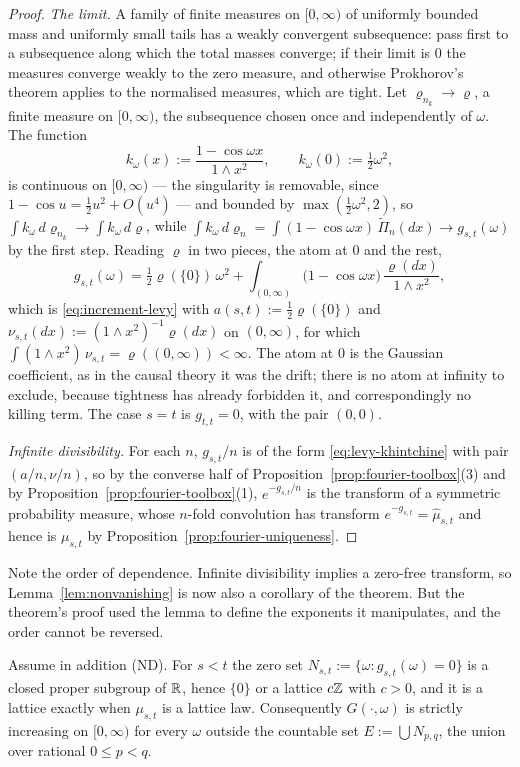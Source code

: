 \begin{proof}
\emph{The limit.} A family of finite measures on $[0,\infty)$ of uniformly bounded mass and
uniformly small tails has a weakly convergent subsequence: pass first to a subsequence along
which the total masses converge; if their limit is $0$ the measures converge weakly to the
zero measure, and otherwise Prokhorov's theorem applies to the normalised measures, which
are tight. Let $\varrho_{n_k} \to \varrho$, a finite measure on $[0,\infty)$, the subsequence
chosen once and independently of $\omega$. The function
\[
  k_\omega(x) := \frac{1 - \cos\omega x}{1 \wedge x^2}, \qquad k_\omega(0) := \tfrac12\omega^2,
\]
is continuous on $[0,\infty)$ --- the singularity is removable, since
$1 - \cos u = \tfrac12u^2 + O(u^4)$ --- and bounded by $\max(\tfrac12\omega^2, 2)$, so
$\int k_\omega\,d\varrho_{n_k} \to \int k_\omega\,d\varrho$, while
$\int k_\omega\,d\varrho_n = \int (1-\cos\omega x)\,\widetilde\Pi_n(dx) \to g_{s,t}(\omega)$ by
the first step. Reading $\varrho$ in two pieces, the atom at $0$ and the rest,
\[
  g_{s,t}(\omega) = \tfrac12\varrho(\{0\})\,\omega^2
   + \int_{(0,\infty)} \bigl(1 - \cos\omega x\bigr)\,\frac{\varrho(dx)}{1 \wedge x^2},
\]
which is \ref{eq:increment-levy} with $a(s,t) := \tfrac12\varrho(\{0\})$ and
$\nu_{s,t}(dx) := (1 \wedge x^2)^{-1}\varrho(dx)$ on $(0,\infty)$, for which
$\int (1 \wedge x^2)\,\nu_{s,t} = \varrho((0,\infty)) < \infty$. The atom at $0$ is the Gaussian
coefficient, as in the causal theory it was the drift; there is no atom at infinity to exclude,
because tightness has already forbidden it, and correspondingly no killing term. The case
$s = t$ is $g_{t,t} = 0$, with the pair $(0,0)$.

\emph{Infinite divisibility.} For each $n$, $g_{s,t}/n$ is of the form
\ref{eq:levy-khintchine} with pair $(a/n, \nu/n)$, so by the converse half of
Proposition~\ref{prop:fourier-toolbox}(3) and by Proposition~\ref{prop:fourier-toolbox}(1),
$e^{-g_{s,t}/n}$ is the transform of a symmetric probability measure, whose $n$-fold
convolution has transform $e^{-g_{s,t}} = \hat\mu_{s,t}$ and hence is $\mu_{s,t}$ by
Proposition~\ref{prop:fourier-uniqueness}.
\end{proof}

Note the order of dependence. Infinite divisibility implies a zero-free transform, so
Lemma~\ref{lem:nonvanishing} is now also a corollary of the theorem. But the theorem's proof
used the lemma to define the exponents it manipulates, and the order cannot be reversed.

\begin{corollary}\label{cor:monotonicity}
Assume in addition (ND). For $s < t$ the zero set
$N_{s,t} := \{\omega : g_{s,t}(\omega) = 0\}$ is a closed proper subgroup of $\mathbb{R}$, hence
$\{0\}$ or a lattice $c\mathbb{Z}$ with $c > 0$, and it is a lattice exactly when $\mu_{s,t}$ is a
lattice law. Consequently $G(\cdot,\omega)$ is strictly increasing on $[0,\infty)$ for every
$\omega$ outside the countable set $E := \bigcup N_{p,q}$, the union over rational
$0 \le p < q$.
\end{corollary}

